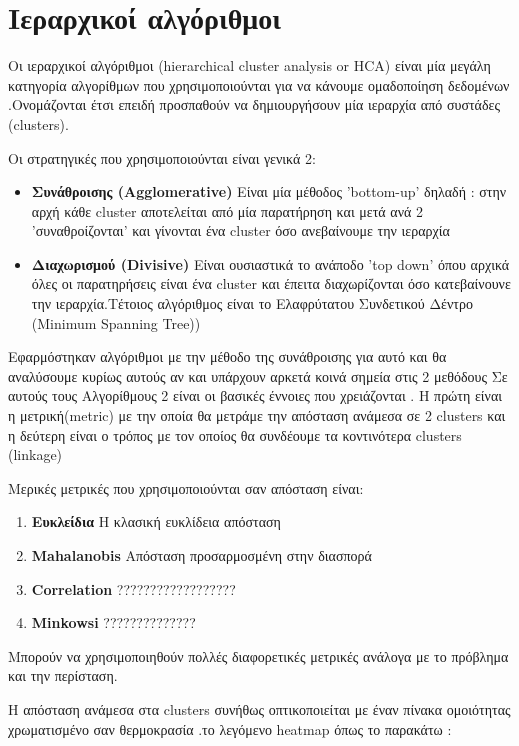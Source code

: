 \chapter{Ιεραρχικοί αλγόριθμοι}
Οι ιεραρχικοί αλγόριθμοι (hierarchical cluster analysis or HCA) είναι μία μεγάλη κατηγορία αλγορίθμων που χρησιμοποιούνται για να κάνουμε ομαδοποίηση δεδομένων .Ονομάζονται έτσι επειδή προσπαθούν να δημιουργήσουν μία ιεραρχία από συστάδες (clusters).

Οι στρατηγικές που χρησιμοποιούνται είναι γενικά 2:
\begin{itemize}
\item{ \textbf{Συνάθροισης (Agglomerative)} Είναι μία μέθοδος 'bottom-up' δηλαδή : στην αρχή κάθε cluster αποτελείται από μία παρατήρηση και μετά ανά 2 'συναθροίζονται' και γίνονται ένα cluster όσο ανεβαίνουμε την ιεραρχία  }
\item{}\textbf{Διαχωρισμού (Divisive)} Είναι ουσιαστικά το ανάποδο 'top down' όπου αρχικά όλες οι παρατηρήσεις είναι ένα cluster και έπειτα διαχωρίζονται όσο κατεβαίνουνε την ιεραρχία.Τέτοιος αλγόριθμος είναι το Ελαφρύτατου Συνδετικού Δέντρο (Minimum Spanning Tree))
\end{itemize}

Εφαρμόστηκαν αλγόριθμοι με την μέθοδο της συνάθροισης για αυτό και θα αναλύσουμε κυρίως   αυτούς αν και υπάρχουν αρκετά κοινά σημεία στις 2 μεθόδους
Σε αυτούς τους Αλγορίθμους 2 είναι οι βασικές έννοιες που χρειάζονται .
Η πρώτη είναι η μετρική(metric) με την οποία θα μετράμε την απόσταση ανάμεσα σε 2 clusters και η δεύτερη είναι ο τρόπος με τον οποίος θα συνδέουμε τα κοντινότερα clusters (linkage)

Μερικές μετρικές που χρησιμοποιούνται σαν απόσταση είναι:
\begin{enumerate}
\item \textbf{Ευκλείδια }H κλασική ευκλίδεια απόσταση
\item \textbf{Mahalanobis }Απόσταση προσαρμοσμένη στην διασπορά
\item \textbf{Correlation }??????????????????
\item \textbf{Minkowsi }  ??????????????
\end{enumerate}
Μπορούν να χρησιμοποιηθούν πολλές διαφορετικές μετρικές ανάλογα με το πρόβλημα και την περίσταση.

\begin{minipage}{\linewidth}%
H απόσταση ανάμεσα στα   clusters  συνήθως οπτικοποιείται με έναν πίνακα ομοιότητας χρωματισμένο σαν θερμοκρασία .το λεγόμενο heatmap  όπως το παρακάτω :
\label{fig:heat1}%
\end{minipage}

